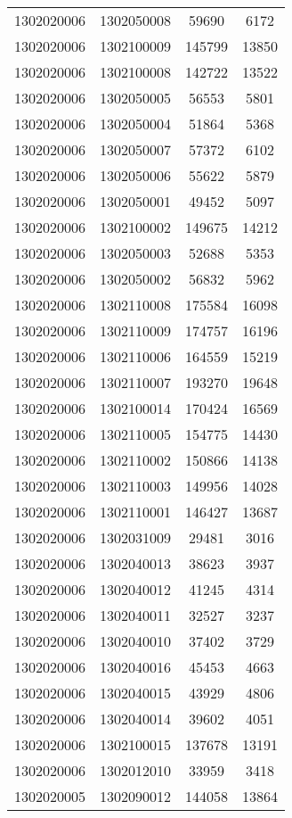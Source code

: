 \begin{longtable}[h]{llcc}
		1302020006 & 1302050008 & 59690 & 6172\\
		1302020006 & 1302100009 & 145799 & 13850\\
		1302020006 & 1302100008 & 142722 & 13522\\
		1302020006 & 1302050005 & 56553 & 5801\\
		1302020006 & 1302050004 & 51864 & 5368\\
		1302020006 & 1302050007 & 57372 & 6102\\
		1302020006 & 1302050006 & 55622 & 5879\\
		1302020006 & 1302050001 & 49452 & 5097\\
		1302020006 & 1302100002 & 149675 & 14212\\
		1302020006 & 1302050003 & 52688 & 5353\\
		1302020006 & 1302050002 & 56832 & 5962\\
		1302020006 & 1302110008 & 175584 & 16098\\
		1302020006 & 1302110009 & 174757 & 16196\\
		1302020006 & 1302110006 & 164559 & 15219\\
		1302020006 & 1302110007 & 193270 & 19648\\
		1302020006 & 1302100014 & 170424 & 16569\\
		1302020006 & 1302110005 & 154775 & 14430\\
		1302020006 & 1302110002 & 150866 & 14138\\
		1302020006 & 1302110003 & 149956 & 14028\\
		1302020006 & 1302110001 & 146427 & 13687\\
		1302020006 & 1302031009 & 29481 & 3016\\
		1302020006 & 1302040013 & 38623 & 3937\\
		1302020006 & 1302040012 & 41245 & 4314\\
		1302020006 & 1302040011 & 32527 & 3237\\
		1302020006 & 1302040010 & 37402 & 3729\\
		1302020006 & 1302040016 & 45453 & 4663\\
		1302020006 & 1302040015 & 43929 & 4806\\
		1302020006 & 1302040014 & 39602 & 4051\\
		1302020006 & 1302100015 & 137678 & 13191\\
		1302020006 & 1302012010 & 33959 & 3418\\
		1302020005 & 1302090012 & 144058 & 13864\\

\end{longtable}
